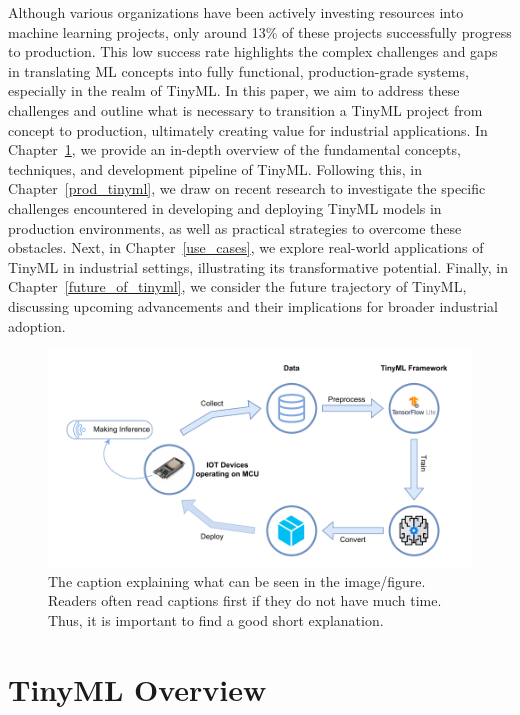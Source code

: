 \documentclass[twocolumn]{article}
\begin{document}
Although various organizations have been actively investing resources into machine learning projects, only around 13\% of these projects successfully progress to production. This low success rate highlights the complex challenges and gaps in translating ML concepts into fully functional, production-grade systems, especially in the realm of TinyML. In this paper, we aim to address these challenges and outline what is necessary to transition a TinyML project from concept to production, ultimately creating value for industrial applications. In Chapter~\ref{tinyml_overview}, we provide an in-depth overview of the fundamental concepts, techniques, and development pipeline of TinyML. Following this, in Chapter~\ref{prod_tinyml}, we draw on recent research to investigate the specific challenges encountered in developing and deploying TinyML models in production environments, as well as practical strategies to overcome these obstacles. Next, in Chapter~\ref{use_cases}, we explore real-world applications of TinyML in industrial settings, illustrating its transformative potential. Finally, in Chapter~\ref{future_of_tinyml}, we consider the future trajectory of TinyML, discussing upcoming advancements and their implications for broader industrial adoption.
\begin{figure}
	\centerline{
	\includegraphics[width=1\columnwidth]{resource/tinyml_deployment.pdf}
	}
	\caption{The caption explaining what can be seen in the image/figure.
	Readers often read captions first if they do not have much time. Thus,
	it is important to find a good short explanation.}
	\label{TUM}
\end{figure}

\section{TinyML Overview} 
\label{tinyml_overview}
\end{document}
